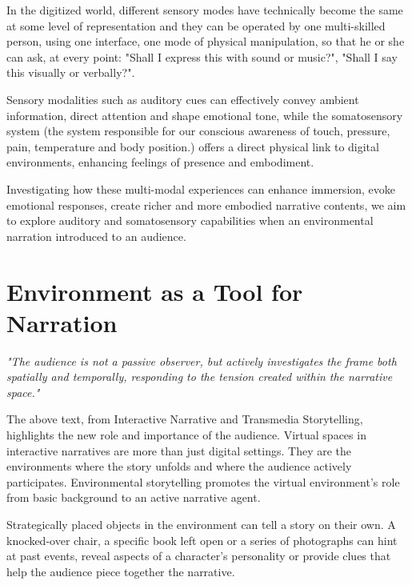     In the digitized world, different sensory modes have technically become the same at some level of representation and they can be operated by one multi-skilled person, using one interface, one mode of physical manipulation, so that he or she can ask, at every point: "Shall I express this with sound or music?", "Shall I say this visually or verbally?"\cite{Multimodal_Discourse}.\par

    Sensory modalities such as auditory cues can effectively convey ambient information, direct attention and shape emotional tone, while the somatosensory system (the system responsible for our conscious awareness of touch, pressure, pain, temperature and body position\cite{Somatic_Sensory}.) offers a direct physical link to digital environments, enhancing feelings of presence and embodiment.\par

    Investigating how these multi-modal experiences can enhance immersion, evoke emotional responses, create richer and more embodied narrative contents, we aim to explore auditory and somatosensory capabilities when an environmental narration introduced to an audience.\par
    \section{Environment as a Tool for Narration} 
    \emph{"The audience is not a passive observer, but actively investigates the frame both spatially and temporally, responding to the tension created within the narrative space."\cite{Transmedia_Storytelling}}

    The above text, from Interactive Narrative and Transmedia Storytelling, highlights the new role and importance of the audience. Virtual spaces in interactive narratives are more than just digital settings. They are the environments where the story unfolds and where the audience actively participates. Environmental storytelling promotes the virtual environment's role from basic background to an active narrative agent.\par

    Strategically placed objects in the environment can tell a story on their own. A knocked-over chair, a specific book left open or a series of photographs can hint at past events, reveal aspects of a character's personality or provide clues that help the audience piece together the narrative\cite{Environmental_Storytelling_Blogpost}.\par 

